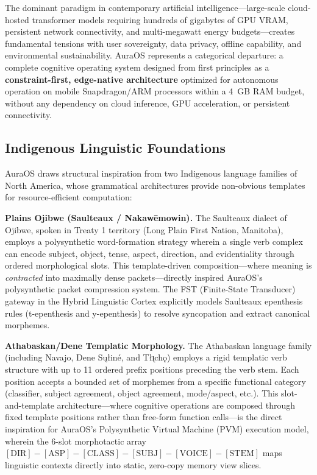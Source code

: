 \documentclass[11pt]{article}
\begin{document}
The dominant paradigm in contemporary artificial intelligence—large-scale cloud-hosted transformer models requiring hundreds of gigabytes of GPU VRAM, persistent network connectivity, and multi-megawatt energy budgets—creates fundamental tensions with user sovereignty, data privacy, offline capability, and environmental sustainability. AuraOS represents a categorical departure: a complete cognitive operating system designed from first principles as a \textbf{constraint-first, edge-native architecture} optimized for autonomous operation on mobile Snapdragon/ARM processors within a 4~GB RAM budget, without any dependency on cloud inference, GPU acceleration, or persistent connectivity.

\subsection{Indigenous Linguistic Foundations}

AuraOS draws structural inspiration from two Indigenous language families of North America, whose grammatical architectures provide non-obvious templates for resource-efficient computation:

\textbf{Plains Ojibwe (Saulteaux / Nakawēmowin).} The Saulteaux dialect of Ojibwe, spoken in Treaty 1 territory (Long Plain First Nation, Manitoba), employs a polysynthetic word-formation strategy wherein a single verb complex can encode subject, object, tense, aspect, direction, and evidentiality through ordered morphological slots. This template-driven composition—where meaning is \textit{contracted} into maximally dense packets—directly inspired AuraOS's polysynthetic packet compression system. The FST (Finite-State Transducer) gateway in the Hybrid Linguistic Cortex explicitly models Saulteaux epenthesis rules (t-epenthesis and y-epenthesis) to resolve syncopation and extract canonical morphemes.

\textbf{Athabaskan/Dene Templatic Morphology.} The Athabaskan language family (including Navajo, Dene Sųłiné, and Tłı̨chǫ) employs a rigid templatic verb structure with up to 11 ordered prefix positions preceding the verb stem. Each position accepts a bounded set of morphemes from a specific functional category (classifier, subject agreement, object agreement, mode/aspect, etc.). This slot-and-template architecture—where cognitive operations are composed through fixed template positions rather than free-form function calls—is the direct inspiration for AuraOS's Polysynthetic Virtual Machine (PVM) execution model, wherein the 6-slot morphotactic array $[\text{DIR}]\!-\![\text{ASP}]\!-\![\text{CLASS}]\!-\![\text{SUBJ}]\!-\![\text{VOICE}]\!-\![\text{STEM}]$ maps linguistic contexts directly into static, zero-copy memory view slices.
\end{document}
